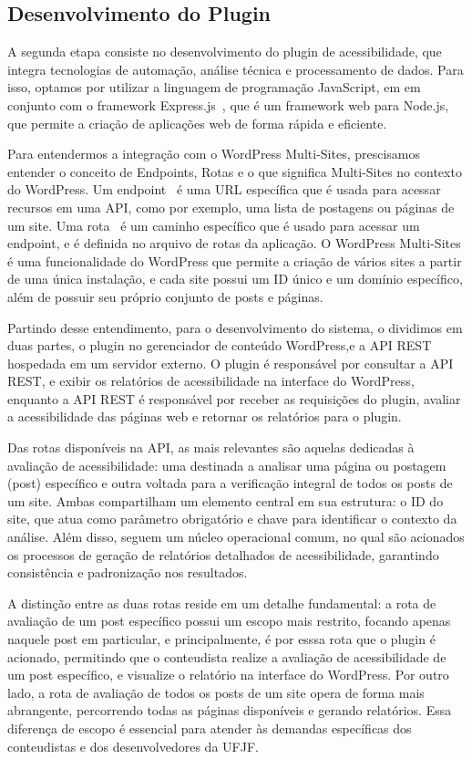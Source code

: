 \documentclass[12pt]{article}
\begin{document}
\subsection{Desenvolvimento do Plugin}
A segunda etapa consiste no desenvolvimento do plugin de acessibilidade, que
integra tecnologias de automação, análise técnica e processamento de
dados. Para isso, optamos por utilizar a linguagem de programação JavaScript, em
em conjunto com o framework Express.js~\autocite{express}, que é um framework web
para Node.js, que permite a criação de aplicações web de forma rápida
e eficiente.

Para entendermos a integração com o WordPress Multi-Sites, prescisamos entender
o conceito de Endpoints, Rotas e o que significa Multi-Sites no contexto do WordPress.
Um endpoint~\autocite{endpoints} é uma URL específica que é usada para acessar
recursos em uma API, como por exemplo, uma lista de postagens ou páginas de um site. Uma
rota~\autocite{routes} é um caminho específico que é usado para acessar um endpoint,
e é definida no arquivo de rotas da aplicação. O WordPress Multi-Sites é uma funcionalidade
do WordPress que permite a criação de vários sites a partir de uma única instalação,
e cada site possui um ID único e um domínio específico, além de possuir seu próprio
conjunto de posts e páginas.

Partindo desse entendimento, para o desenvolvimento do sistema, o
dividimos em duas partes, o plugin no gerenciador de conteúdo WordPress,e a
API REST hospedada em um servidor externo. O plugin é responsável por
consultar a API REST, e exibir os relatórios de acessibilidade na interface do
WordPress, enquanto a API REST é responsável por receber as requisições
do plugin, avaliar a acessibilidade das páginas web e retornar os relatórios
para o plugin.

Das rotas disponíveis na API, as mais relevantes são aquelas dedicadas
à avaliação de acessibilidade: uma destinada a analisar uma página ou postagem (post)
específico e outra voltada para a verificação integral de todos os posts de um
site. Ambas compartilham um elemento central em sua estrutura: o ID do
site, que atua como parâmetro obrigatório e chave para identificar o contexto
da análise. Além disso, seguem um núcleo operacional comum, no qual são
acionados os processos de geração de relatórios detalhados de acessibilidade,
garantindo consistência e padronização nos resultados.

A distinção entre as duas rotas reside em um detalhe fundamental: a rota
de avaliação de um post específico possui um escopo mais restrito, focando
apenas naquele post em particular, e principalmente, é por esssa rota que 
o plugin é acionado, permitindo que o conteudista realize a avaliação de 
acessibilidade de um post específico, e visualize o relatório na interface do 
WordPress. Por outro lado, a rota de avaliação de todos os posts de um site
opera de forma mais abrangente, percorrendo todas as páginas disponíveis 
e gerando relatórios. Essa diferença de escopo é essencial para atender às 
demandas específicas dos conteudistas e dos desenvolvedores da UFJF.
\bigbreak
\end{document}
